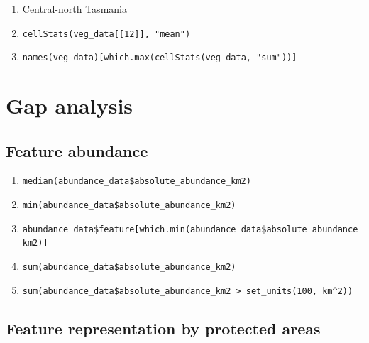 \documentclass[12pt,]{book}
\providecommand{\tightlist}{%
  \setlength{\itemsep}{0pt}\setlength{\parskip}{0pt}}
\let\BeginKnitrBlock\begin \let\EndKnitrBlock\end
\begin{document}
\BeginKnitrBlock{rmdanswer}
\begin{enumerate}
\def\labelenumi{\arabic{enumi}.}
\tightlist
\item
  Central-north Tasmania
\item
  \texttt{cellStats(veg\_data{[}{[}12{]}{]},\ "mean")}
\item
  \texttt{names(veg\_data){[}which.max(cellStats(veg\_data,\ "sum")){]}}
\end{enumerate}
\EndKnitrBlock{rmdanswer}

\section{Gap analysis}\label{gap-analysis}

\subsection{Feature abundance}\label{feature-abundance-1}

\BeginKnitrBlock{rmdanswer}
\begin{enumerate}
\def\labelenumi{\arabic{enumi}.}
\tightlist
\item
  \texttt{median(abundance\_data\$absolute\_abundance\_km2)}
\item
  \texttt{min(abundance\_data\$absolute\_abundance\_km2)}
\item
  \texttt{abundance\_data\$feature{[}which.min(abundance\_data\$absolute\_abundance\_km2){]}}
\item
  \texttt{sum(abundance\_data\$absolute\_abundance\_km2)}
\item
  \texttt{sum(abundance\_data\$absolute\_abundance\_km2\ \textgreater{}\ set\_units(100,\ km\^{}2))}
\end{enumerate}
\EndKnitrBlock{rmdanswer}

\subsection{Feature representation by protected
areas}\label{feature-representation-by-protected-areas-1}
\end{document}
